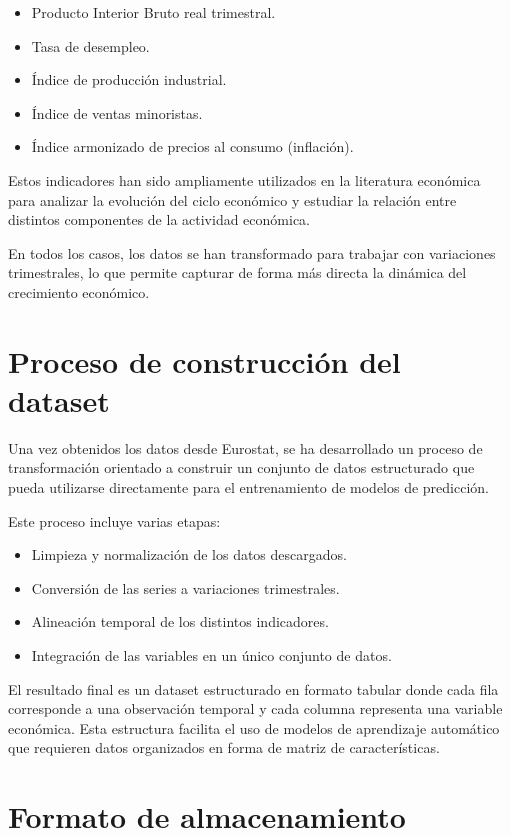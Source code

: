 \begin{itemize}
    \item Producto Interior Bruto real trimestral.
    \item Tasa de desempleo.
    \item Índice de producción industrial.
    \item Índice de ventas minoristas.
    \item Índice armonizado de precios al consumo (inflación).
\end{itemize}

Estos indicadores han sido ampliamente utilizados en la literatura económica para analizar la evolución del ciclo económico y estudiar la relación entre distintos componentes de la actividad económica.

En todos los casos, los datos se han transformado para trabajar con variaciones trimestrales, lo que permite capturar de forma más directa la dinámica del crecimiento económico.

\section{Proceso de construcción del dataset}

Una vez obtenidos los datos desde Eurostat, se ha desarrollado un proceso de transformación orientado a construir un conjunto de datos estructurado que pueda utilizarse directamente para el entrenamiento de modelos de predicción.

Este proceso incluye varias etapas:

\begin{itemize}
    \item Limpieza y normalización de los datos descargados.
    \item Conversión de las series a variaciones trimestrales.
    \item Alineación temporal de los distintos indicadores.
    \item Integración de las variables en un único conjunto de datos.
\end{itemize}

El resultado final es un dataset estructurado en formato tabular donde cada fila corresponde a una observación temporal y cada columna representa una variable económica. Esta estructura facilita el uso de modelos de aprendizaje automático que requieren datos organizados en forma de matriz de características.

\section{Formato de almacenamiento}

